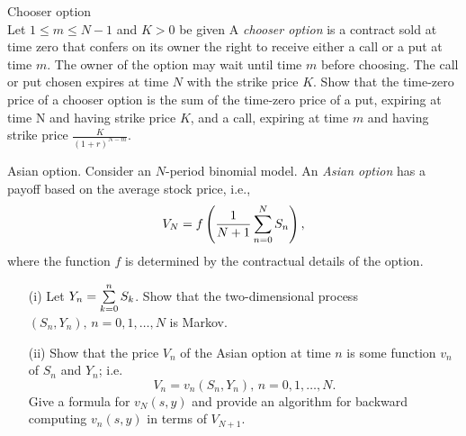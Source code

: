 \begin{problem}
 Chooser option \\
 Let $1\le m\le N-1$ and $K>0$ be given
A \emph{chooser option} is a contract sold at time zero that confers on its owner
the right to receive either a call or a put at time $m$. The owner of the option may
wait until time $m$ before choosing. The call or put chosen expires at time $N$ with
the strike price $K$. Show that the time-zero price of a chooser option is the sum of
the time-zero price of a put, expiring at time N and having strike price $K$, and a call,
expiring at time $m$ and having strike price $\frac{K}{(1+r)^{N-m}}.$

\begin{sol}

\end{sol}
\end{problem}

\begin{problem}
Asian option. Consider an $N$-period binomial model.
An \emph{Asian option} has a payoff based on the average stock price, i.e.,
\[
V_N=f\left(\frac{1}{N+1}\sum\limits_{n=0}^{N} S_n \right),
\]
\ni where the function $f$ is determined by the contractual details of the option.
\begin{itemize}
\item[(i)] Let $Y_n=\sum\limits_{k=0}^{n} S_k$. Show that the two-dimensional process
$(S_n,Y_n),\, n=0,1,\dots,N$ is Markov.

\item[(ii)] Show that the price $V_n$ of the Asian option at time $n$
is some function $v_n$ of $S_n$ and $Y_n$; i.e.
\[
V_n=v_n(S_n,Y_n),\, n=0,1,\dots,N.
\]
\ni Give a formula for $v_N(s,y)$ and provide an algorithm for backward computing
$v_n(s,y)$ in terms of $V_{N+1}.$
\end{itemize}


\begin{sol}

\end{sol}
\end{problem}

